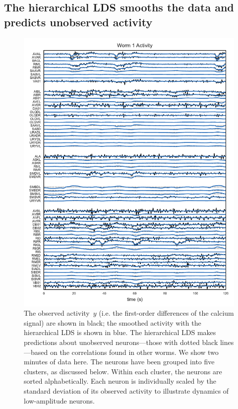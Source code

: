 \documentclass{article}
\begin{document}
\clearpage

\subsection{The hierarchical LDS smooths the data and predicts unobserved activity}


\begin{figure}[h]
  \centering
  \includegraphics[width=5.5in]{figures/lds/y_0}
  \caption{The observed activity~$y$ (i.e. the first-order differences
    of the calcium signal) are shown in black; the smoothed activity
    with the hierarchical LDS is shown in blue.  The hierarchical LDS
    makes predictions about unobserved neurons---those with dotted
    black lines---based on the correlations found in other worms. We
    show two minutes of data here.  The neurons have been grouped into
    five clusters, as discussed below.  Within each cluster, the
    neurons are sorted alphabetically. Each neuron is individually
    scaled by the standard deviation of its observed activity to
    illustrate dynamics of low-amplitude neurons. }
  \label{fig:activity_1}
\end{figure}
\end{document}
